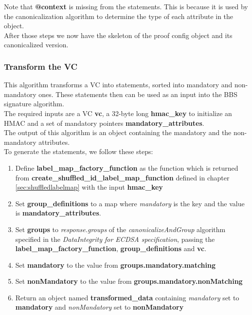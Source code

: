 \documentclass[
	a4paper               %
	,BCOR=0mm            %
	,bibliography=totoc   %
	,listof=totoc         %
	,monolingual
	,twoside=false
]{bfhthesis}              %
\begin{document}
Note that \textbf{@context} is missing from the statements.
This is because it is used by the canonicalization algorithm to determine the type of each attribute in the object.\\

After those steps we now have the skeleton of the proof config object and its canonicalized version.

\subsubsection{Transform the VC}
\label{sub:transformvc}
This algorithm transforms a VC into statements, sorted into mandatory and non-mandatory ones. These statements then can be used as an input into the BBS signature algorithm.\\

The required inputs are a VC \textbf{vc}, a 32-byte long \textbf{hmac\_key} to initialize an HMAC and a set of mandatory pointers \textbf{mandatory\_attributes}.\\

The output of this algorithm is an object containing the mandatory and the non-mandatory attributes.\\

To generate the statements, we follow these steps:
\begin{enumerate}
	\item Define \textbf{label\_map\_factory\_function} as the function which is returned from \textbf{create\_shuffled\_id\_label\_map\_function} defined in chapter \ref{sec:shuffledlabelmap} with the input \textbf{hmac\_key}
	\item Set \textbf{group\_definitions} to a map where \textit{mandatory} is the key and the value is \textbf{mandatory\_attributes}.
	\item Set \textbf{groups} to \textit{response.groups} of the \textit{canonicalizeAndGroup} algorithm specified in the \textit{DataIntegrity for ECDSA specification}\cite{ecdsa}, passing the \textbf{label\_map\_factory\_function}, \textbf{group\_definitions} and \textbf{vc}.
	\item Set \textbf{mandatory} to the value from \textbf{groups.mandatory.matching}
	\item Set \textbf{nonMandatory} to the value from \textbf{groups.mandatory.nonMatching}
	\item Return an object named \textbf{transformed\_data} containing \textit{mandatory} set to \textbf{mandatory} and \textit{nonMandatory} set to \textbf{nonMandatory}
\end{enumerate}
\end{document}
